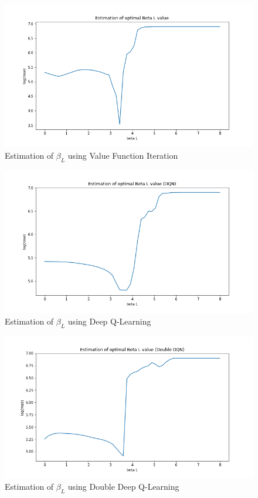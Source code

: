 \begin{figure}
    \centering
    \includegraphics[scale=0.4]{figures/dqi_model1_estimation_Beta_L}
    \caption{Estimation of $\beta_L$ using Value Function Iteration}
    \label{fig:dqi_model1_optimal_beta_L}
\end{figure}

\begin{figure}
    \centering
    \includegraphics[scale=0.4]{figures/dqn_model1_estimation_Beta_L}
    \caption{Estimation of $\beta_L$ using Deep Q-Learning}
    \label{fig:dqi_model1_optimal_beta_L}
\end{figure}

\begin{figure}
    \centering
    \includegraphics[scale=0.4]{figures/ddqn_model1_estimation_Beta_L}
    \caption{Estimation of $\beta_L$ using Double Deep Q-Learning}
    \label{fig:dqi_model1_optimal_beta_L}
\end{figure}

\fi